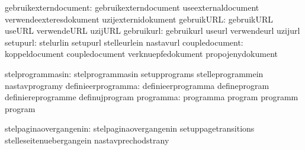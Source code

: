         gebruikexterndocument:  gebruikexterndocument        useexternaldocument
                                verwendeexteresdokument      uzijexternidokument
                   gebruikURL:  gebruikURL                   useURL
                                verwendeURL                  uzijURL
                   gebruikurl:  gebruikurl                   useurl
                                verwendeurl                  uzijurl
                     setupurl:  stelurlin                    setupurl
                                stelleurlein                 nastavurl
               coupledocument:  koppeldocument               coupledocument
                                verknuepfedokument           propojenydokument

             stelprogrammasin:  stelprogrammasin             setupprograms
                                stelleprogrammein            nastavprogramy
           definieerprogramma:  definieerprogramma           defineprogram
                                definiereprogramme           definujprogram
                    programma:  programma                    program
                                programm                     program

       stelpaginaovergangenin:  stelpaginaovergangenin       setuppagetransitions
                                stelleseitenuebergangein     nastavprechodstrany


